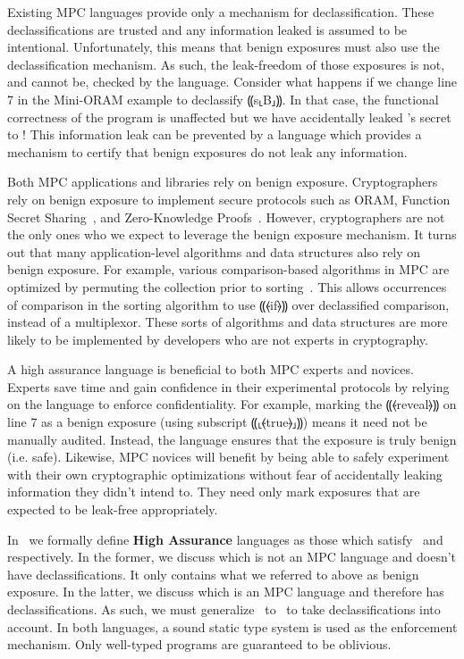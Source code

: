 Existing MPC languages provide only a mechanism for declassification. These declassifications are trusted and any
information leaked is assumed to be intentional. Unfortunately, this means that benign exposures must also use the
declassification mechanism. As such, the leak-freedom of those exposures is not, and cannot be, checked by the language.
Consider what happens if we change line 7 in the Mini-ORAM example to declassify ⸨s⸤B⸥⸩.
In that case, the functional correctness of the program is unaffected but we have accidentally leaked \bob's secret to \alice!
This information leak can be prevented by a language which provides a mechanism to certify that benign exposures do
not leak any information.

Both MPC applications and libraries rely on benign exposure. Cryptographers rely on benign exposure to implement secure protocols such as ORAM,
Function Secret Sharing~\cite{cryptoeprint:2018:707}, and Zero-Knowledge Proofs~\cite{doi:10.1137/0218012}. However, cryptographers are not the only
ones who we expect to leverage the benign exposure mechanism. It turns out that many application-level algorithms and data structures also rely on benign exposure. For example,
various comparison-based algorithms in MPC are optimized by permuting the collection prior to sorting~\cite{obliv-quicksort}. This allows occurrences of
comparison in the sorting algorithm to use ⸨⦑if⦒⸩ over declassified comparison, instead of a multiplexor. These sorts of algorithms and
data structures are more likely to be implemented by developers who are not experts in cryptography.

A high assurance language is beneficial to both MPC experts and novices. Experts save time and gain confidence in their
experimental protocols by relying on the language to enforce confidentiality. For example, marking the ⸨⦑reveal⦒⸩ on line
7 as a benign exposure (using subscript ⸨⸤⦑true⦒⸥⸩) means it need not be manually audited. Instead, the language ensures that the
exposure is truly benign (i.e. safe). Likewise, MPC novices will benefit by being able to safely experiment with their own cryptographic optimizations
without fear of accidentally leaking information they didn't intend to. They need only mark exposures that are expected to be leak-free appropriately.

In~ we formally define \textbf{High Assurance} languages as those which satisfy~ and~
respectively. In the former, we discuss \obliv which is not an MPC language and doesn't have declassifications. It only contains what we referred to above
as benign exposure. In the latter, we discuss \lang which is an MPC language and therefore has declassifications. As such, we must generalize~
to~ to take declassifications into account. In both languages, a sound static type system is used as the enforcement mechanism. Only well-typed
programs are guaranteed to be oblivious.
